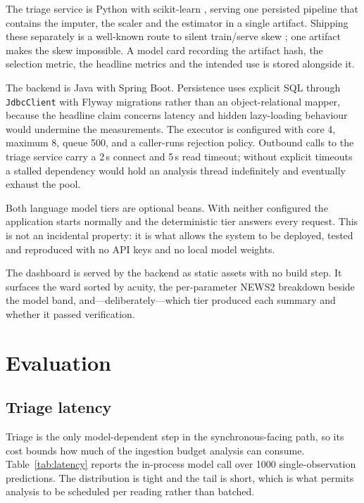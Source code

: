 \documentclass[lettersize,journal]{IEEEtran}
\begin{document}
The triage service is Python with scikit-learn \cite{pedregosa2011}, serving one
persisted pipeline that contains the imputer, the scaler and the estimator in a
single artifact. Shipping these separately is a well-known route to silent
train/serve skew \cite{kreuzberger2023}; one artifact makes the skew impossible. A
model card recording the artifact hash, the selection metric, the headline
metrics and the intended use is stored alongside it.

The backend is Java with Spring Boot. Persistence uses explicit SQL through
\texttt{JdbcClient} with Flyway migrations rather than an object-relational
mapper, because the headline claim concerns latency and hidden lazy-loading
behaviour would undermine the measurements. The executor is configured with core
4, maximum 8, queue 500, and a caller-runs rejection policy. Outbound calls to
the triage service carry a 2\,s connect and 5\,s read timeout; without explicit
timeouts a stalled dependency would hold an analysis thread indefinitely and
eventually exhaust the pool.

Both language model tiers are optional beans. With neither configured the
application starts normally and the deterministic tier answers every request.
This is not an incidental property: it is what allows the system to be deployed,
tested and reproduced with no API keys and no local model weights.

The dashboard is served by the backend as static assets with no build step. It
surfaces the ward sorted by acuity, the per-parameter NEWS2 breakdown beside the
model band, and---deliberately---which tier produced each summary and whether it
passed verification.

\section{Evaluation}
\label{sec:eval}

\subsection{Triage latency}

Triage is the only model-dependent step in the synchronous-facing path, so its
cost bounds how much of the ingestion budget analysis can consume.
Table~\ref{tab:latency} reports the in-process model call over 1000
single-observation predictions. The distribution is tight and the tail is short,
which is what permits analysis to be scheduled per reading rather than batched.
\end{document}
